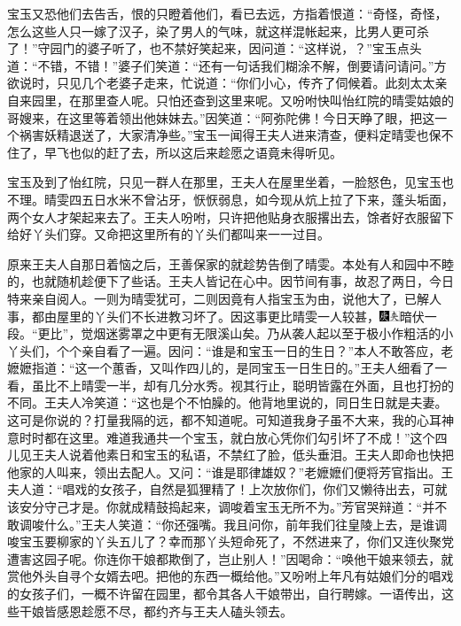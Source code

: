 宝玉又恐他们去告舌，恨的只瞪着他们，看已去远，方指着恨道：``奇怪，奇怪，怎么这些人只一嫁了汉子，染了男人的气味，就这样混帐起来，比男人更可杀了！''守园门的婆子听了，也不禁好笑起来，因问道：``这样说，？''宝玉点头道：``不错，不错！''婆子们笑道：``还有一句话我们糊涂不解，倒要请问请问。''方欲说时，只见几个老婆子走来，忙说道：``你们小心，传齐了伺候着。此刻太太亲自来园里，在那里查人呢。只怕还查到这里来呢。又吩咐快叫怡红院的晴雯姑娘的哥嫂来，在这里等着领出他妹妹去。''因笑道：``阿弥陀佛！今日天睁了眼，把这一个祸害妖精退送了，大家清净些。''宝玉一闻得王夫人进来清查，便料定晴雯也保不住了，早飞也似的赶了去，所以这后来趁愿之语竟未得听见。

宝玉及到了怡红院，只见一群人在那里，王夫人在屋里坐着，一脸怒色，见宝玉也不理。晴雯四五日水米不曾沾牙，恹恹弱息，如今现从炕上拉了下来，蓬头垢面，两个女人才架起来去了。王夫人吩咐，只许把他贴身衣服撂出去，馀者好衣服留下给好丫头们穿。又命把这里所有的丫头们都叫来一一过目。

原来王夫人自那日着恼之后，王善保家的就趁势告倒了晴雯。本处有人和园中不睦的，也就随机趁便下了些话。王夫人皆记在心中。因节间有事，故忍了两日，今日特来亲自阅人。一则为晴雯犹可，二则因竟有人指宝玉为由，说他大了，已解人事，都由屋里的丫头们不长进教习坏了。因这事更比晴雯一人较甚，{\includegraphics[width=3mm]{../Images/00004}\includegraphics[width=3mm]{../Images/00012}\footnotesize \kaishu 暗伏一段。``更比''，觉烟迷雾罩之中更有无限溪山矣。}乃从袭人起以至于极小作粗活的小丫头们，个个亲自看了一遍。因问：``谁是和宝玉一日的生日？''本人不敢答应，老嬷嬷指道：``这一个蕙香，又叫作四儿的，是同宝玉一日生日的。''王夫人细看了一看，虽比不上晴雯一半，却有几分水秀。视其行止，聪明皆露在外面，且也打扮的不同。王夫人冷笑道：``这也是个不怕臊的。他背地里说的，同日生日就是夫妻。这可是你说的？打量我隔的远，都不知道呢。可知道我身子虽不大来，我的心耳神意时时都在这里。难道我通共一个宝玉，就白放心凭你们勾引坏了不成！''这个四儿见王夫人说着他素日和宝玉的私语，不禁红了脸，低头垂泪。王夫人即命也快把他家的人叫来，领出去配人。又问：``谁是耶律雄奴？''老嬷嬷们便将芳官指出。王夫人道：``唱戏的女孩子，自然是狐狸精了！上次放你们，你们又懒待出去，可就该安分守己才是。你就成精鼓捣起来，调唆着宝玉无所不为。''芳官哭辩道：``并不敢调唆什么。''王夫人笑道：``你还强嘴。我且问你，前年我们往皇陵上去，是谁调唆宝玉要柳家的丫头五儿了？幸而那丫头短命死了，不然进来了，你们又连伙聚党遭害这园子呢。你连你干娘都欺倒了，岂止别人！''因喝命：``唤他干娘来领去，就赏他外头自寻个女婿去吧。把他的东西一概给他。''又吩咐上年凡有姑娘们分的唱戏的女孩子们，一概不许留在园里，都令其各人干娘带出，自行聘嫁。一语传出，这些干娘皆感恩趁愿不尽，都约齐与王夫人磕头领去。


